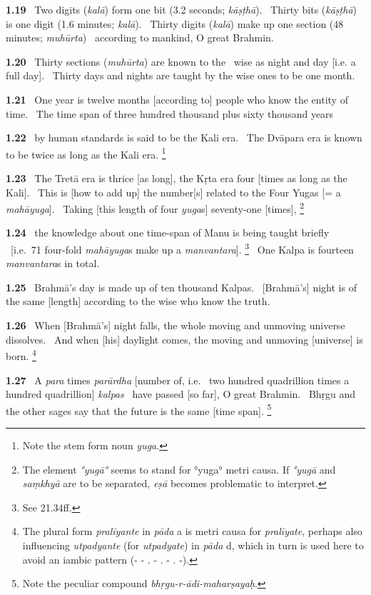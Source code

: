 \documentclass{article}
\newcommand{\skt}[1]{\textit{#1}}
\begin{document}
\textbf{1.19}%
\ Two digits (\skt{kalā}) form one bit (3.2 seconds; \skt{kāṣṭhā}).%
\                  Thirty bits (\skt{kāṣṭhā}) is one digit (1.6 minutes; \skt{kalā}).%
\ Thirty digits (\skt{kalā}) make up one section (48 minutes; \skt{muhūrta})%
\                                 according to mankind, O great Brahmin.%


\textbf{1.20}%
\ Thirty sections (\skt{muhūrta}) are known to the%
\                         wise as night and day [i.e. a full day].%
\ Thirty days and nights are taught by the wise ones to be one month.%


\textbf{1.21}%
\ One year is twelve months [according to] people who know the entity of time.%
\ The time span of three hundred thousand plus sixty thousand years%


\textbf{1.22}%
\ by human standards is said to be the Kali era.%
\ The Dvāpara era is known to be twice as long as the Kali era.%
\footnote{Note the stem form noun \skt{yuga}. }%


\textbf{1.23}%
\ The Tretā era is thrice [as long], the Kṛta era four [times as long as the Kali].%
\ This is [how to add up] the number[s] related to the Four Yugas [= a \skt{mahāyuga}].%
\                 Taking [this length of four \skt{yuga}s] seventy-one [times],%
\footnote{The element \skt{°yugā°} seems to stand for °yuga° metri causa.                If \skt{°yugā} and \skt{saṃkhyā} are to be separated, \skt{eṣā} becomes                 problematic to interpret. }%


\textbf{1.24}%
\ the knowledge about one time-span of Manu is being taught briefly%
\              [i.e.\ 71 four-fold \skt{mahāyuga}s make up a \skt{manvantara}].%
\footnote{See 21.34ff. }%
\ One Kalpa is fourteen \skt{manvantara}s in total.%


\textbf{1.25}%
\ Brahmā's day is made up of ten thousand Kalpas.%
\ [Brahmā's] night is of the same [length] according to the wise who know the truth.%


\textbf{1.26}%
\ When [Brahmā's] night falls, the whole moving and unmoving universe dissolves.%
\ And when [his] daylight comes, the moving and unmoving [universe] is born.%
\footnote{The plural form \skt{pralīyante} in \skt{pāda} a is metri causa for \skt{pralīyate},                perhaps also influencing \skt{utpadyante} (for \skt{utpadyate}) in \skt{pāda} d,                which in turn is used here to avoid an iambic pattern (- - . - . - . -). }%


\textbf{1.27}%
\ A \skt{para} times \skt{parārdha} [number of, i.e.%
\                two hundred quadrillion times a hundred quadrillion] \skt{kalpas}%
\                 have passed [so far], O great Brahmin.%
\ Bhṛgu and the other sages say that the future is the same [time span].%
\footnote{Note the peculiar compound \skt{bhṛgu-r-ādi-maharṣayaḥ}. }%
\end{document}
